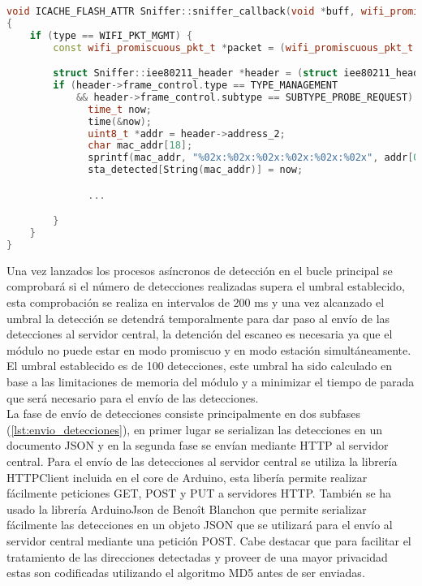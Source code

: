 \documentclass[../proyecto.tex]{subfiles}
\begin{document}
\begin{lstlisting}[language=C++, caption=Función \textit{callback} para el modo promiscuo , captionpos=b, frame=single, label={lst:wifi_callback}]
void ICACHE_FLASH_ATTR Sniffer::sniffer_callback(void *buff, wifi_promiscuous_pkt_type_t type)
{
    if (type == WIFI_PKT_MGMT) {
        const wifi_promiscuous_pkt_t *packet = (wifi_promiscuous_pkt_t *)buff;

        struct Sniffer::iee80211_header *header = (struct iee80211_header*) packet->payload;
        if (header->frame_control.type == TYPE_MANAGEMENT
            && header->frame_control.subtype == SUBTYPE_PROBE_REQUEST) {
              time_t now;
              time(&now);
              uint8_t *addr = header->address_2;
              char mac_addr[18];
              sprintf(mac_addr, "%02x:%02x:%02x:%02x:%02x:%02x", addr[0], addr[1], addr[2], addr[3], addr[4], addr[5]);
              sta_detected[String(mac_addr)] = now;

              ...

        }
    }
}
\end{lstlisting}

Una vez lanzados los procesos asíncronos de detección en el bucle principal se comprobará si el número de detecciones realizadas supera el umbral establecido, esta comprobación se realiza en intervalos de 200 ms y una vez alcanzado el umbral la detección se detendrá temporalmente para dar paso al envío de las detecciones al servidor central, la detención del escaneo es necesaria ya que el módulo no puede estar en modo promiscuo y en modo estación simultáneamente. El umbral establecido es de 100 detecciones, este umbral ha sido calculado en base a las limitaciones de memoria del módulo y a minimizar el tiempo de parada que será necesario para el envío de las detecciones.\\

La fase de envío de detecciones consiste principalmente en dos subfases (\autoref{lst:envio_detecciones}), en primer lugar se serializan las detecciones en un documento JSON y en la segunda fase se envían mediante HTTP al servidor central. Para el envío de las detecciones al servidor central se utiliza la librería HTTPClient incluida en el core de Arduino, esta libería permite realizar fácilmente peticiones GET, POST y PUT a servidores HTTP. También se ha usado la librería ArduinoJson de Benoît Blanchon que permite serializar fácilmente las detecciones en un objeto JSON que se utilizará para el envío al servidor central mediante una petición POST. Cabe destacar que para facilitar el tratamiento de las direcciones detectadas y proveer de una mayor privacidad estas son codificadas utilizando el algoritmo MD5 antes de ser enviadas.\\
\end{document}
